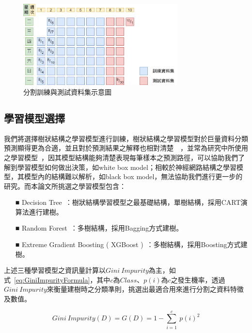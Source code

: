 \begin{figure}[!htb]
  \begin{center}
    \includegraphics[width=0.75\textwidth]{figures/Image_SplitDataset.png}
    \caption[分割訓練與測試資料集示意圖]{分割訓練與測試資料集示意圖}
    \label{fig:Image_SplitDataset}
  \end{center}
\end{figure}

\subsection{學習模型選擇}
\label{subsec:ModelSelection}

我們將選擇樹狀結構之學習模型進行訓練，樹狀結構之學習模型對於巨量資料分類預測顯得更為合適，並且對於預測結果之解釋也相對清楚~\cite{lee2018game}~\cite{sifa2015predicting}，並常為研究中所使用之學習模型~\cite{wu2008top}，因其模型結構能夠清楚表現每筆樣本之預測路徑，可以協助我們了解到學習模型如何做出決策，如white box model；相較於神經網路結構之學習模型，其模型內的結構難以解析，如black box model，無法協助我們進行更一步的研究。而本論文所挑選之學習模型包含：

\begin{itemize}
  \item [■] Decision Tree~\cite{breiman1984classification}：樹狀結構學習模型之最基礎結構，單樹結構，採用CART演算法進行建樹。
  \item [■] Random Forest~\cite{breiman2001random}：多樹結構，採用Bagging方式建樹。
  \item [■] Extreme Gradient Boosting ( XGBoost )~\cite{chen2016xgboost}：多樹結構，採用Boosting方式建樹。
\end{itemize}
\newpage

上述三種學習模型之資訊量計算以$Gini\ Impurity$為主，如式~\ref{eq:GiniImpurityFormula}，其中$c$為$Class$、$p(i)$為$c$之發生機率，透過$Gini\ Impurity$來衡量建樹時之分類準則，挑選出最適合用來進行分割之資料特徵及數值。

\begin{equation}
  \label{eq:GiniImpurityFormula}
  Gini\ Impurity(D) = G(D) = 1 - \sum_{i = 1}^{c}\ p(i)^2
\end{equation}

